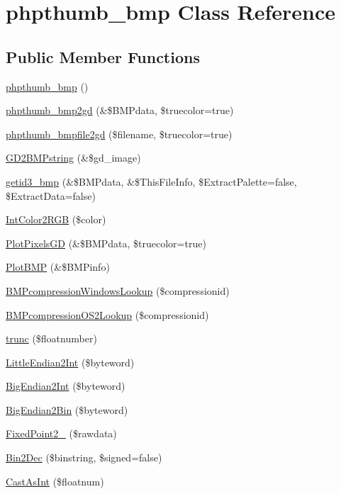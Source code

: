 \hypertarget{classphpthumb__bmp}{\section{phpthumb\-\_\-bmp \-Class \-Reference}
\label{classphpthumb__bmp}
}
\subsection*{\-Public \-Member \-Functions}
\begin{DoxyCompactItemize}
\item 
\hyperlink{classphpthumb__bmp_a7674f0035627071cc4665c96648f70e9}{phpthumb\-\_\-bmp} ()
\item 
\hyperlink{classphpthumb__bmp_adf556f7837426e021b7ca47979905f47}{phpthumb\-\_\-bmp2gd} (\&\$\-B\-M\-Pdata, \$truecolor=true)
\item 
\hyperlink{classphpthumb__bmp_a0fe63e4dfd3268819c2c752b6e2c3ccc}{phpthumb\-\_\-bmpfile2gd} (\$filename, \$truecolor=true)
\item 
\hyperlink{classphpthumb__bmp_ab8f84a61bd42bbaf400d84b997f26ac2}{\-G\-D2\-B\-M\-Pstring} (\&\$gd\-\_\-image)
\item 
\hyperlink{classphpthumb__bmp_a5eedc253a01c759c8272b04e745b7809}{getid3\-\_\-bmp} (\&\$\-B\-M\-Pdata, \&\$\-This\-File\-Info, \$\-Extract\-Palette=false, \$\-Extract\-Data=false)
\item 
\hyperlink{classphpthumb__bmp_a8bf25280e284a2783b2f88e63ac5e2f3}{\-Int\-Color2\-R\-G\-B} (\$color)
\item 
\hyperlink{classphpthumb__bmp_aa6f01d9bdd1f8b7519b1d80efd1548b4}{\-Plot\-Pixels\-G\-D} (\&\$\-B\-M\-Pdata, \$truecolor=true)
\item 
\hyperlink{classphpthumb__bmp_a642021194ff4aef59fbd499ab98eaff2}{\-Plot\-B\-M\-P} (\&\$\-B\-M\-Pinfo)
\item 
\hyperlink{classphpthumb__bmp_a3db6a546059fe670ff6369e099071da5}{\-B\-M\-Pcompression\-Windows\-Lookup} (\$compressionid)
\item 
\hyperlink{classphpthumb__bmp_a97c54152a15128853a7fb821ea1dd074}{\-B\-M\-Pcompression\-O\-S2\-Lookup} (\$compressionid)
\item 
\hyperlink{classphpthumb__bmp_aacd5cb89f7851598708d81fb6bf9b68e}{trunc} (\$floatnumber)
\item 
\hyperlink{classphpthumb__bmp_aa2995099166b60cecd3dbd49d2b251fc}{\-Little\-Endian2\-Int} (\$byteword)
\item 
\hyperlink{classphpthumb__bmp_a6fe1c1642646a29e1e2c175d91c799bd}{\-Big\-Endian2\-Int} (\$byteword)
\item 
\hyperlink{classphpthumb__bmp_acc52362ddf13154ebb1b7d4d04f1cd35}{\-Big\-Endian2\-Bin} (\$byteword)
\item 
\hyperlink{classphpthumb__bmp_afcf8a2a2273717f09ee22de187dc6e5f}{\-Fixed\-Point2\-\_} (\$rawdata)
\item 
\hyperlink{classphpthumb__bmp_a9e681e4a80ce155a556254f1dbe4b15b}{\-Bin2\-Dec} (\$binstring, \$signed=false)
\item 
\hyperlink{classphpthumb__bmp_ac945ebc6977a9cd6d6bf72943e8223f7}{\-Cast\-As\-Int} (\$floatnum)
\end{DoxyCompactItemize}


